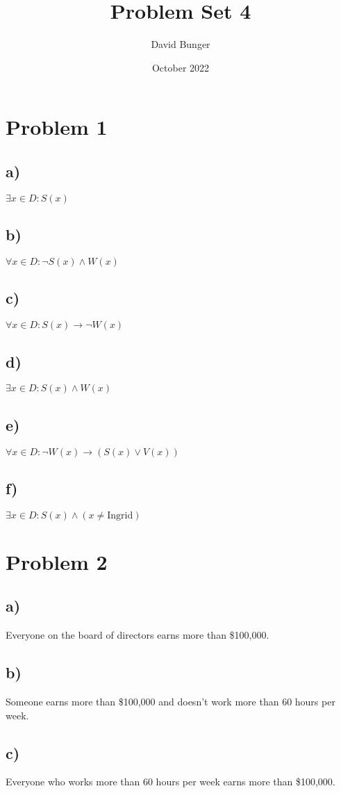 \documentclass{article}
\title{Problem Set 4}
\author{David Bunger}
\date{October 2022}
\begin{document}
\maketitle

\section*{Problem 1}
\subsection*{a)}
$\exists x \in D:S(x)$
\subsection*{b)}
$\forall x \in D: \neg S(x) \land W(x)$
\subsection*{c)}
$\forall x \in D: S(x) \rightarrow \neg W(x)$
\subsection*{d)}
$\exists x \in D: S(x) \land W(x)$
\subsection*{e)}
$\forall x \in D: \neg W(x) \rightarrow (S(x)\lor V(x))$
\subsection*{f)}
$\exists x \in D: S(x) \land (x \neq \text{Ingrid})$
\clearpage
\section*{Problem 2}
\subsection*{a)}
Everyone on the board of directors earns more than \$100,000.
\subsection*{b)}
Someone earns more than \$100,000 and doesn't work more than 60 hours per week.
\subsection*{c)}
Everyone who works more than 60 hours per week earns more than \$100,000.
\end{document}
